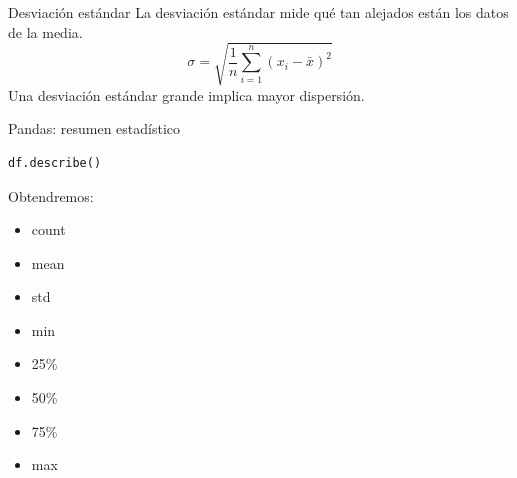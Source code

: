 \documentclass[aspectratio=169,11pt]{beamer}
\begin{document}
\begin{frame}{Desviación estándar}
La desviación estándar mide qué tan alejados están los datos de la media.
\[
\sigma =
\sqrt{
\frac{1}{n}
\sum_{i=1}^{n}
(x_i-\bar{x})^2
}
\]
Una desviación estándar grande implica mayor dispersión.
\end{frame}
\begin{frame}[fragile]{Pandas: resumen estadístico}
\begin{lstlisting}
df.describe()
\end{lstlisting}
Obtendremos:
\begin{itemize}
    \item count
    \item mean
    \item std
    \item min
    \item 25\%
    \item 50\%
    \item 75\%
    \item max
\end{itemize}
\end{frame}
\end{document}
